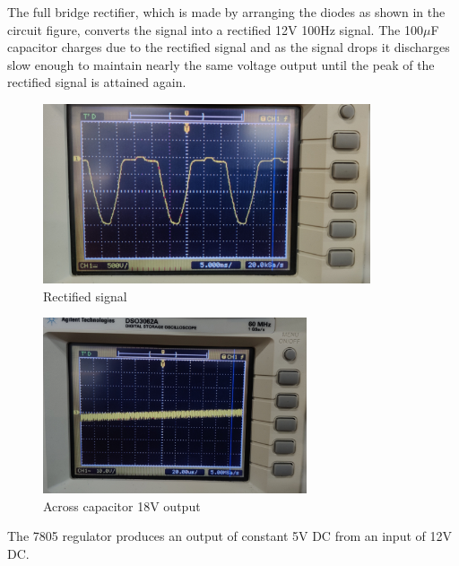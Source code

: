 \documentclass{article}
\begin{document}
The full bridge rectifier, which is made by arranging the diodes as shown in the circuit figure, converts the signal into a rectified 12V 100Hz signal. The 100$\mu$F capacitor charges due to the rectified signal and as the signal drops it discharges slow enough to maintain nearly the same voltage output until the peak of the rectified signal is attained again.\\
\begin{figure}
    \centering
    \includegraphics[width=\columnwidth]{figs/rect.png}
    \caption{Rectified signal}
    \label{fig:my_label}
\end{figure}
\begin{figure}
    \centering
    \includegraphics[width=\columnwidth]{figs/cap.png}
    \caption{Across capacitor 18V output}
    \label{fig:my_label}
\end{figure}
The 7805 regulator produces an output of constant 5V DC from an input of 12V DC.\\
\end{document}
